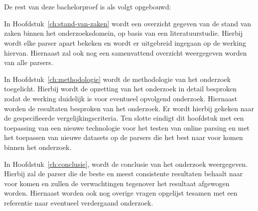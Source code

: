 \section{}
\label{sec:opzet-bachelorproef}


De rest van deze bachelorproef is als volgt opgebouwd:

In Hoofdstuk~\ref{ch:stand-van-zaken} wordt een overzicht gegeven van de stand van zaken binnen het onderzoeksdomein, op basis van een literatuurstudie. Hierbij wordt elke parser apart bekeken en wordt er uitgebreid ingegaan op de werking hiervan. Hiernaast zal ook nog een samenvattend overzicht weergegeven worden van alle parsers.

In Hoofdstuk~\ref{ch:methodologie} wordt de methodologie van het onderzoek toegelicht. Hierbij wordt de opzetting van het onderzoek in detail besproken zodat de werking duidelijk is voor eventueel opvolgend onderzoek. Hiernaast worden de resultaten besproken van het onderzoek. Er wordt hierbij gekeken naar de gespecifieerde vergelijkingscriteria. Ten slotte eindigt dit hoofdstuk met een toepassing van een nieuwe technologie voor het testen van online parsing en met het toepassen van nieuwe datasets op de parsers die het best naar voor komen binnen het onderzoek.

In Hoofdstuk~\ref{ch:conclusie}, wordt de conclusie van het onderzoek weergegeven. Hierbij zal de parser die de beste en meest consistente resultaten behaalt naar voor komen en zullen de verwachtingen tegenover het resultaat afgewogen worden. Hiernaast worden ook nog overige vragen opgelijst tesamen met een referentie naar eventueel verdergaand onderzoek.